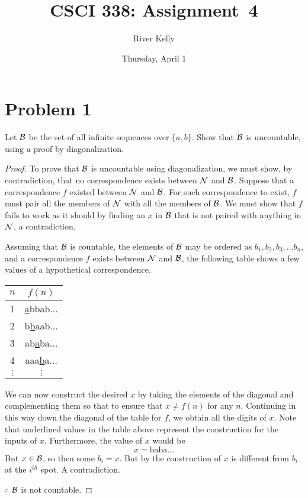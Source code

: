 \documentclass[11pt]{article}
\title{CSCI 338: Assignment~4}
\author{River Kelly}
\date{Thursday, April 1}
\begin{document}
\maketitle

\newpage
\section*{Problem 1}

Let ${\cal B}$ be the set of all infinite sequences over $\{a,b\}$. Show that
${\cal B}$ is uncountable, using a proof by diagonalization.

\begin{proof}
To prove that ${\cal B}$ is uncountable using diagonalization, we must show, by contradiction, that no correspondence exists between $\cal N$ and $\cal B$.
Suppose that a correspondence $f$ existed between $\cal N$ and $\cal B$.
For such correspondence to exist, $f$ must pair all the members of $\cal N$ with all the members of $\cal B$.
We must show that $f$ fails to work as it should by finding an $x$ in $\cal B$ that is not paired with anything in $\cal N$, a contradiction.

\noindent
Assuming that ${\cal B}$ is countable, the elements of ${\cal B}$ may be ordered as $b_{1}, b_{2}, b_{3}, \ldots b_{n}$, and a correspondence $f$ exists between $\cal N$ and $\cal B$, the following table shows a few values of a hypothetical correspondence.

\begin{center}
\begin{tabular}{ c | c }
 $n$ & $f(n)$ \\
 \hline 
 1 & \underline{a}bbab$\ldots$ \\
 2 & b\underline{b}aab$\ldots$ \\
 3 & ab\underline{a}ba$\ldots$ \\
 4 & aaa\underline{b}a$\ldots$ \\
 $\vdots$ & $\vdots$
\end{tabular}
\end{center}

\noindent
We can now construct the desired $x$ by taking the elements of the diagonal and complementing them so that to ensure that $x \neq f(n)$ for any $n$.
Continuing in this way down the diagonal of the table for $f$, we obtain all the digits of $x$.
Note that underlined values in the table above represent the construction for the inputs of $x$. Furthermore, the value of $x$ would be 
$$x = \text{baba}\ldots$$
But $x \in \cal B$, so then some $b_{i} = x$. But by the construction of $x$ is different from $b_{i}$ at the $i^{th}$ spot. A contradiction.

\noindent
$\therefore$ $\cal B$ is not countable. 
\end{proof}
\end{document}
